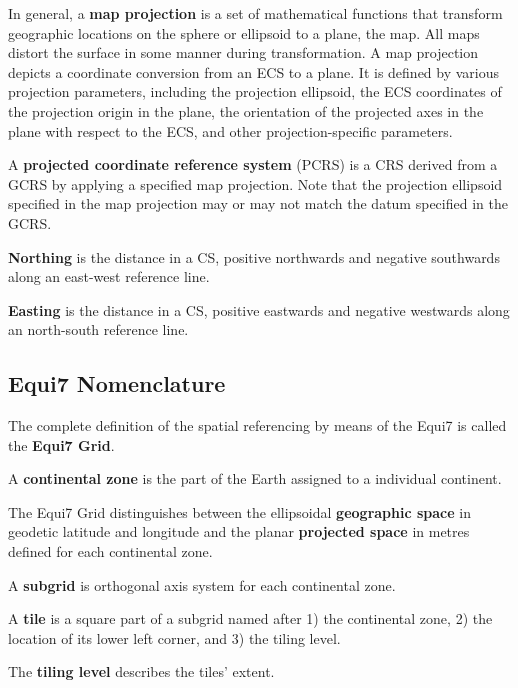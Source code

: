 \documentclass[10pt,a4paper]{article}
\begin{document}
In general, a \textbf{map projection} is a set of mathematical functions that transform geographic locations on the sphere or ellipsoid to a plane, the map. All maps distort the surface in some manner during transformation. A map projection depicts a coordinate conversion from an ECS to a plane. It is defined by various projection parameters, including the projection ellipsoid, the ECS coordinates of the projection origin in the plane, the orientation of the projected axes in the plane with respect to the ECS, and other projection-specific parameters. 

A \textbf{projected coordinate reference system} (PCRS) is a CRS derived from a GCRS by applying a specified map projection. Note that the projection ellipsoid specified in the map projection may or may not match the datum specified in the GCRS.

\textbf{Northing} is the distance in a CS, positive northwards and negative southwards along an east-west reference line.

\textbf{Easting} is the distance in a CS, positive eastwards and negative westwards along an north-south reference line.

\subsection*{Equi7 Nomenclature}

The complete definition of the spatial referencing by means of the Equi7 is called the \textbf{Equi7 Grid}. 

A \textbf{continental zone} is the part of the Earth assigned to a individual continent.

The Equi7 Grid distinguishes between the ellipsoidal \textbf{geographic space} in geodetic latitude and longitude and the planar \textbf{projected space} in metres defined for each continental zone.

A \textbf{subgrid} is orthogonal axis system for each continental zone.

A \textbf{tile} is a square part of a subgrid named after 1) the continental zone, 2) the location of its lower left corner, and 3) the tiling level.

The \textbf{tiling level} describes the tiles' extent.



\end{document}
